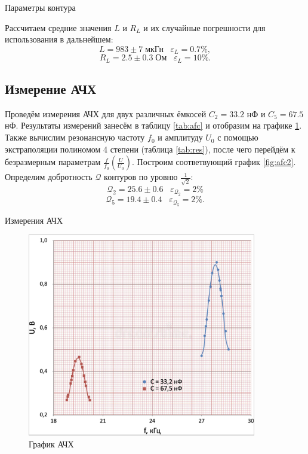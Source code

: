\documentclass[12pt,a4paper]{article}
\begin{document}
\begin{table}[H]
	\centering
	\footnotesize
	
	\caption{Параметры контура}
	\label{tab:params}
\end{table}



Рассчитаем средние значения $L$ и $R_L$ и их случайные погрешности для использования в дальнейшем:
$$L = 983 \pm 7 \; \text{мкГн} \;\;\; \varepsilon_L = 0.7 \%,$$
$$R_L = 2.5 \pm 0.3 \; \text{Ом} \;\;\; \varepsilon_L = 10 \%.$$

\subsection*{Измерение АЧХ}

Проведём измерения АЧХ для двух различных ёмкосей $C_2=33.2$ нФ и $C_5=67.5$ нФ. Результаты измерений занесём в таблицу \ref{tab:afc} и отобразим на графике \ref{fig:afc1}. Также вычислим резонансную частоту $f_0$ и амплитуду $U_0$ с помощью экстраполяции полиномом 4 степени (таблица \ref{tab:res}), после чего перейдём к безразмерным параметрам $\frac{f}{f_0}\left(\frac{U}{U_0}\right)$. Построим соответвующий график \ref{fig:afc2}. Определим добротность $\mathcal{Q}$ контуров по уровню $\frac{1}{\sqrt{2}}$:
    $$\mathcal{Q}_2 = 25.6 \pm 0.6 \;\;\; \varepsilon_{\mathcal{Q}_2} = 2 \%$$
    $$\mathcal{Q}_5 = 19.4 \pm 0.4 \;\;\; \varepsilon_{\mathcal{Q}_5} = 2 \%.$$

\begin{table}[H]
	\centering
	\footnotesize
	
	\caption{Измерения АЧХ}
	\label{tab:afc}
\end{table}

\begin{figure}[H]
	\centering
	\includegraphics[width=10cm]{"src/afc1.png"}
	\caption{График АЧХ}
	\label{fig:afc1}
\end{figure}
\end{document}
